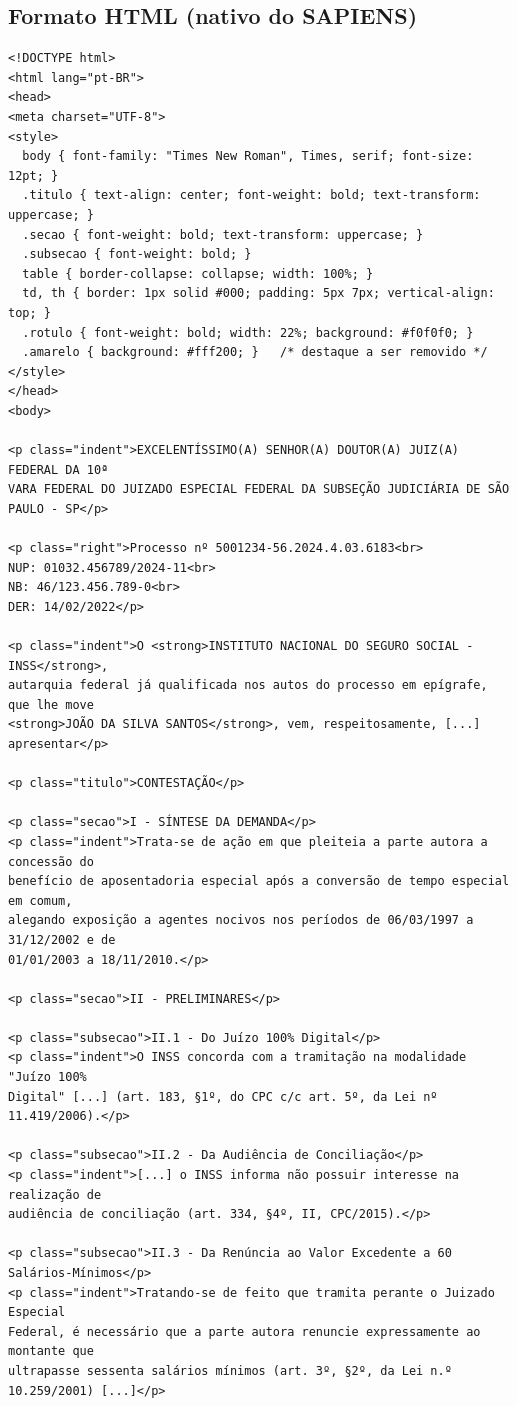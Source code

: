 \documentclass[11pt,a4paper]{article}
\begin{document}
\subsection{Formato HTML (nativo do SAPIENS)}
\begin{lstlisting}[style=html]
<!DOCTYPE html>
<html lang="pt-BR">
<head>
<meta charset="UTF-8">
<style>
  body { font-family: "Times New Roman", Times, serif; font-size: 12pt; }
  .titulo { text-align: center; font-weight: bold; text-transform: uppercase; }
  .secao { font-weight: bold; text-transform: uppercase; }
  .subsecao { font-weight: bold; }
  table { border-collapse: collapse; width: 100%; }
  td, th { border: 1px solid #000; padding: 5px 7px; vertical-align: top; }
  .rotulo { font-weight: bold; width: 22%; background: #f0f0f0; }
  .amarelo { background: #fff200; }   /* destaque a ser removido */
</style>
</head>
<body>

<p class="indent">EXCELENTÍSSIMO(A) SENHOR(A) DOUTOR(A) JUIZ(A) FEDERAL DA 10ª
VARA FEDERAL DO JUIZADO ESPECIAL FEDERAL DA SUBSEÇÃO JUDICIÁRIA DE SÃO PAULO - SP</p>

<p class="right">Processo nº 5001234-56.2024.4.03.6183<br>
NUP: 01032.456789/2024-11<br>
NB: 46/123.456.789-0<br>
DER: 14/02/2022</p>

<p class="indent">O <strong>INSTITUTO NACIONAL DO SEGURO SOCIAL - INSS</strong>,
autarquia federal já qualificada nos autos do processo em epígrafe, que lhe move
<strong>JOÃO DA SILVA SANTOS</strong>, vem, respeitosamente, [...] apresentar</p>

<p class="titulo">CONTESTAÇÃO</p>

<p class="secao">I - SÍNTESE DA DEMANDA</p>
<p class="indent">Trata-se de ação em que pleiteia a parte autora a concessão do
benefício de aposentadoria especial após a conversão de tempo especial em comum,
alegando exposição a agentes nocivos nos períodos de 06/03/1997 a 31/12/2002 e de
01/01/2003 a 18/11/2010.</p>

<p class="secao">II - PRELIMINARES</p>

<p class="subsecao">II.1 - Do Juízo 100% Digital</p>
<p class="indent">O INSS concorda com a tramitação na modalidade "Juízo 100%
Digital" [...] (art. 183, §1º, do CPC c/c art. 5º, da Lei nº 11.419/2006).</p>

<p class="subsecao">II.2 - Da Audiência de Conciliação</p>
<p class="indent">[...] o INSS informa não possuir interesse na realização de
audiência de conciliação (art. 334, §4º, II, CPC/2015).</p>

<p class="subsecao">II.3 - Da Renúncia ao Valor Excedente a 60 Salários-Mínimos</p>
<p class="indent">Tratando-se de feito que tramita perante o Juizado Especial
Federal, é necessário que a parte autora renuncie expressamente ao montante que
ultrapasse sessenta salários mínimos (art. 3º, §2º, da Lei n.º 10.259/2001) [...]</p>


\end{lstlisting}
\end{document}
